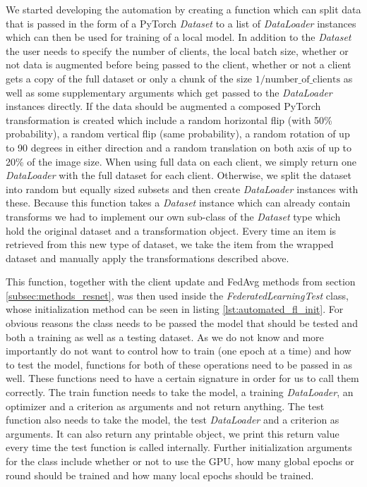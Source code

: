 We started developing the automation by creating a function which can split data that is passed in the form of a PyTorch \textit{Dataset} to a list of \textit{DataLoader} instances which can then be used for training of a local model. In addition to the \textit{Dataset} the user needs to specify the number of clients, the local batch size, whether or not data is augmented before being passed to the client, whether or not a client gets a copy of the full dataset or only a chunk of the size $ 1 / \text{number\_of\_clients} $ as well as some supplementary arguments which get passed to the \textit{DataLoader} instances directly.
If the data should be augmented a composed PyTorch transformation is created which include a random horizontal flip (with 50\% probability), a random vertical flip (same probability), a random rotation of up to 90 degrees in either direction and a random translation on both axis of up to 20\% of the image size.
When using full data on each client, we simply return one \textit{DataLoader} with the full dataset for each client. Otherwise, we split the dataset into random but equally sized subsets and then create \textit{DataLoader} instances with these. 
Because this function takes a \textit{Dataset} instance which can already contain transforms we had to implement our own sub-class of the \textit{Dataset} type which hold the original dataset and a transformation object. Every time an item is retrieved from this new type of dataset, we take the item from the wrapped dataset and manually apply the transformations described above.

This function, together with the client update and FedAvg methods from section \ref{subsec:methods_resnet}, was then used inside the \textit{FederatedLearningTest} class, whose initialization method can be seen in listing \ref{lst:automated_fl_init}. For obvious reasons the class needs to be passed the model that should be tested and both a training as well as a testing dataset. As we do not know and more importantly do not want to control how to train (one epoch at a time) and how to test the model, functions for both of these operations need to be passed in as well. These functions need to have a certain signature in order for us to call them correctly. The train function needs to take the model, a training \textit{DataLoader}, an optimizer and a criterion as arguments and not return anything. The test function also needs to take the model, the test \textit{DataLoader} and a criterion as arguments. It can also return any printable object, we print this return value every time the test function is called internally.
Further initialization arguments for the class include whether or not to use the GPU, how many global epochs or round should be trained and how many local epochs should be trained. 

